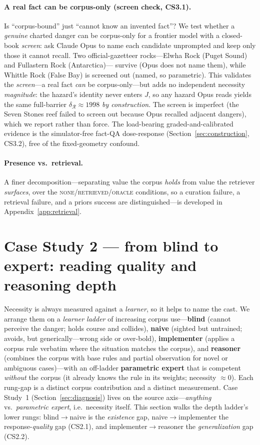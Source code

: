 \documentclass{article}
\newcommand{\regret}{\mathcal{R}}
\begin{document}
\paragraph{A real fact can be corpus-only (screen check, CS3.1).} Is ``corpus-bound'' just ``cannot know an
invented fact''? We test whether a \emph{genuine} charted danger can be corpus-only for a frontier model
with a closed-book \emph{screen}: ask Claude Opus to name each candidate unprompted and keep only those it
cannot recall. Two official-gazetteer rocks---Elwha Rock (Puget Sound) and Fullastern Rock (Antarctica)---
survive (Opus does not name them), while Whittle Rock (False Bay) is screened out (named, so parametric).
This validates the \emph{screen}---a real fact \emph{can} be corpus-only---but adds no independent necessity
\emph{magnitude}: the hazard's identity never enters $J$, so any hazard Opus reads yields the same
full-barrier $\delta_{\regret}\!\approx\!1998$ \emph{by construction}. The screen is imperfect (the Seven
Stones reef failed to screen out because Opus recalled adjacent dangers), which we report rather than force.
The load-bearing graded-and-calibrated evidence is the simulator-free fact-QA dose-response
(Section~\ref{sec:construction}, CS3.2), free of the fixed-geometry confound.

\paragraph{Presence vs.\ retrieval.} A finer decomposition---separating value the corpus \emph{holds}
from value the retriever \emph{surfaces}, over the \textsc{none}/\textsc{retrieved}/\textsc{oracle}
conditions, so a curation failure, a retrieval failure, and a priors success are distinguished---is
developed in Appendix~\ref{app:retrieval}.

\section{Case Study 2 --- from blind to expert: reading quality and reasoning depth}
\label{sec:depth}
Necessity is always measured against a \emph{learner}, so it helps to name the cast. We arrange them
on a \emph{learner ladder} of increasing corpus use---\textbf{blind} (cannot perceive the danger;
holds course and collides), \textbf{naive} (sighted but untrained; avoids, but generically---wrong
side or over-bold), \textbf{implementer} (applies a corpus rule verbatim where the situation matches
the corpus), and \textbf{reasoner} (combines the corpus with base rules and partial observation for
novel or ambiguous cases)---with an off-ladder \textbf{parametric expert} that is competent
\emph{without} the corpus (it already knows the rule in its weights; necessity $\approx 0$). Each
rung-gap is a distinct corpus contribution and a distinct measurement. Case Study~1
(Section~\ref{sec:diagnosis}) lives on the source axis---\emph{anything} vs.\ \emph{parametric
expert}, i.e.\ necessity itself. This section walks the depth ladder's lower rungs: blind$\to$naive is
the \emph{existence} gap, naive$\to$implementer the response-\emph{quality} gap (CS2.1), and
implementer$\to$reasoner the \emph{generalization} gap (CS2.2).
\end{document}
